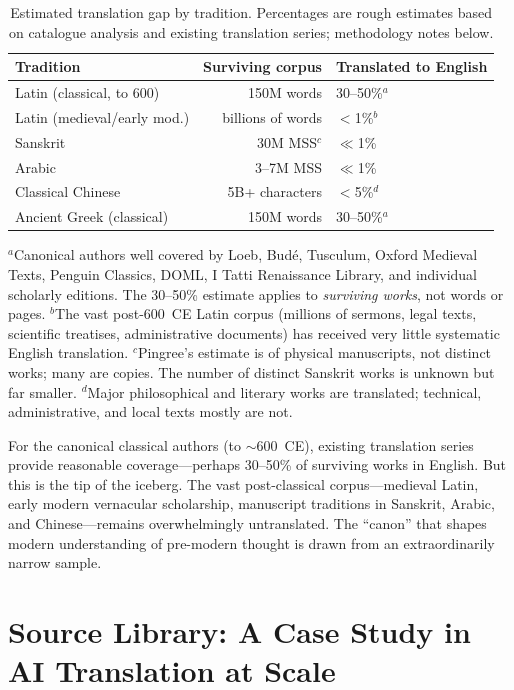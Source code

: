 \documentclass[10pt,twocolumn]{article}
\begin{document}
\begin{table}[H]
\small
\centering
\caption{Estimated translation gap by tradition. Percentages are rough estimates based on catalogue analysis and existing translation series; methodology notes below.}
\label{tab:gap}
\begin{tabular}{@{}lrl@{}}
\toprule
Tradition & Surviving corpus & Translated to English \\
\midrule
Latin (classical, to 600) & 150M words & 30--50\%$^a$ \\
Latin (medieval/early mod.) & billions of words & $<$1\%$^b$ \\
Sanskrit & 30M MSS$^c$ & $\ll$1\% \\
Arabic & 3--7M MSS & $\ll$1\% \\
Classical Chinese & 5B+ characters & $<$5\%$^d$ \\
Ancient Greek (classical) & 150M words & 30--50\%$^a$ \\
\bottomrule
\end{tabular}
\end{table}

{\footnotesize \noindent $^a$Canonical authors well covered by Loeb, Bud\'e, Tusculum, Oxford Medieval Texts, Penguin Classics, DOML, I Tatti Renaissance Library, and individual scholarly editions. The 30--50\% estimate applies to \emph{surviving works}, not words or pages. $^b$The vast post-600~CE Latin corpus (millions of sermons, legal texts, scientific treatises, administrative documents) has received very little systematic English translation. $^c$Pingree's estimate is of physical manuscripts, not distinct works; many are copies. The number of distinct Sanskrit works is unknown but far smaller. $^d$Major philosophical and literary works are translated; technical, administrative, and local texts mostly are not.}

\smallskip
For the canonical classical authors (to ${\sim}$600~CE), existing translation series provide reasonable coverage---perhaps 30--50\% of surviving works in English. But this is the tip of the iceberg. The vast post-classical corpus---medieval Latin, early modern vernacular scholarship, manuscript traditions in Sanskrit, Arabic, and Chinese---remains overwhelmingly untranslated. The ``canon'' that shapes modern understanding of pre-modern thought is drawn from an extraordinarily narrow sample.

\section{Source Library: A Case Study in AI Translation at Scale}
\end{document}
